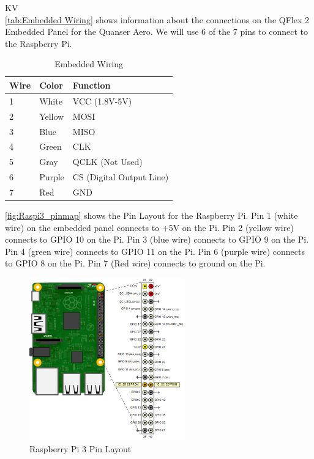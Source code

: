 \documentclass[fontsize=11pt, %
                             paper=letter, %
                             openany, %
                             captions=tableheading,
                             index=totoc,
                             hyperref]{labbook}
\begin{document}
\begin{addmargin}[0cm]{0cm}
KV\\
\autoref{tab:Embedded Wiring} shows information about the connections on the  QFlex 2 Embedded Panel for the Quanser Aero.  We will use 6 of the 7 pins to connect to the Raspberry Pi.

\begin{table}[h!]
    \centering
    \begin{tabular}{l|l|l}
        \toprule
        \textbf{Wire} & \textbf{Color} & \textbf{Function}\\
        \toprule
        1 & White & VCC (1.8V-5V)\\
        2 & Yellow & MOSI\\
        3 & Blue & MISO\\
        4 & Green & CLK\\
        5 & Gray & QCLK (Not Used)\\
        6 & Purple & CS (Digital Output Line)\\
        7 & Red & GND\\
        \bottomrule
    \end{tabular}
    \caption{Embedded Wiring}
    \label{tab:Embedded Wiring}
\end{table}

\autoref{fig:Raspi3_pinmap} shows the Pin Layout for the Raspberry Pi.  Pin 1 (white wire) on the embedded panel connects to +5V on the Pi.  Pin 2 (yellow wire) connects to GPIO 10 on the Pi. Pin 3 (blue wire) connects to GPIO 9 on the Pi.  Pin 4 (green wire) connects to GPIO 11 on the Pi. Pin 6 (purple wire) connects to GPIO 8 on the Pi.  Pin 7 (Red wire) connects to ground on the Pi.

\begin{figure}[h]
  \centering
  \includegraphics[width=0.6\textwidth]{figs/img/Raspi3_pinmap}
  \caption{Raspberry Pi 3 Pin Layout}
  \label{fig:Raspi3_pinmap}
\end{figure}


\end{addmargin}
\end{document}
